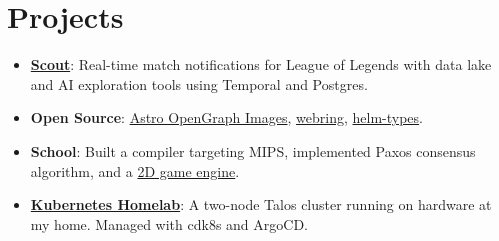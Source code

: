 \documentclass[letterpaper,11pt]{article}
\newcommand{\resumeItem}[2]{
  \item\small{
    \textbf{#1}{: #2 \vspace{-2pt}}
  }
}
\newcommand{\resumeSubItem}[2]{\resumeItem{#1}{#2}\vspace{-4pt}}
\newcommand{\resumeSubHeadingListStart}{\begin{itemize}[leftmargin=*]}
\newcommand{\resumeSubHeadingListEnd}{\end{itemize}}
\begin{document}

\section{Projects}
  \resumeSubHeadingListStart
    \resumeSubItem{\href{https://scout-for-lol.com}{Scout}}{Real-time match notifications for League of Legends with data lake and AI exploration tools using Temporal and Postgres.}
    \resumeSubItem{Open Source}{\href{https://www.npmjs.com/package/astro-opengraph-images}{Astro OpenGraph Images}, \href{https://www.npmjs.com/package/webring}{webring}, \href{https://www.npmjs.com/package/@shepherdjerred/helm-types}{helm-types}.}
    \resumeSubItem{School}{Built a compiler targeting MIPS, implemented Paxos consensus algorithm, and a \href{https://github.com/shepherdjerred/monorepo/tree/main/sandbox/archive/castle-casters}{2D game engine}.}
    \resumeSubItem{\href{https://github.com/shepherdjerred/monorepo/tree/main/packages/homelab}{Kubernetes Homelab}}{A two-node Talos cluster running on hardware at my home. Managed with cdk8s and ArgoCD.}
  \resumeSubHeadingListEnd

\end{document}
